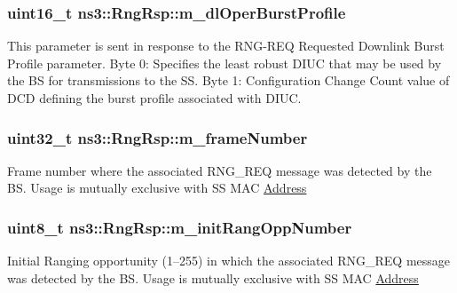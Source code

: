 \subsubsection[{\texorpdfstring{m\+\_\+dl\+Oper\+Burst\+Profile}{m_dlOperBurstProfile}}]{\setlength{\rightskip}{0pt plus 5cm}uint16\+\_\+t ns3\+::\+Rng\+Rsp\+::m\+\_\+dl\+Oper\+Burst\+Profile\hspace{0.3cm}{\ttfamily [private]}}\hypertarget{classns3_1_1RngRsp_a0e814c8df274e0681dbb33f7b3bb2e1a}{}\label{classns3_1_1RngRsp_a0e814c8df274e0681dbb33f7b3bb2e1a}
This parameter is sent in response to the R\+N\+G-\/\+R\+EQ Requested Downlink Burst Profile parameter. Byte 0\+: Specifies the least robust D\+I\+UC that may be used by the BS for transmissions to the SS. Byte 1\+: Configuration Change Count value of D\+CD defining the burst profile associated with D\+I\+UC. 
\subsubsection[{\texorpdfstring{m\+\_\+frame\+Number}{m_frameNumber}}]{\setlength{\rightskip}{0pt plus 5cm}uint32\+\_\+t ns3\+::\+Rng\+Rsp\+::m\+\_\+frame\+Number\hspace{0.3cm}{\ttfamily [private]}}\hypertarget{classns3_1_1RngRsp_ade08f14222f2e177310e8afa4ca12871}{}\label{classns3_1_1RngRsp_ade08f14222f2e177310e8afa4ca12871}
Frame number where the associated R\+N\+G\+\_\+\+R\+EQ message was detected by the BS. Usage is mutually exclusive with SS M\+AC \hyperlink{classns3_1_1Address}{Address} 
\subsubsection[{\texorpdfstring{m\+\_\+init\+Rang\+Opp\+Number}{m_initRangOppNumber}}]{\setlength{\rightskip}{0pt plus 5cm}uint8\+\_\+t ns3\+::\+Rng\+Rsp\+::m\+\_\+init\+Rang\+Opp\+Number\hspace{0.3cm}{\ttfamily [private]}}\hypertarget{classns3_1_1RngRsp_a782078323f5571e9e3eadb586c9b4533}{}\label{classns3_1_1RngRsp_a782078323f5571e9e3eadb586c9b4533}
Initial Ranging opportunity (1–255) in which the associated R\+N\+G\+\_\+\+R\+EQ message was detected by the BS. Usage is mutually exclusive with SS M\+AC \hyperlink{classns3_1_1Address}{Address} 
